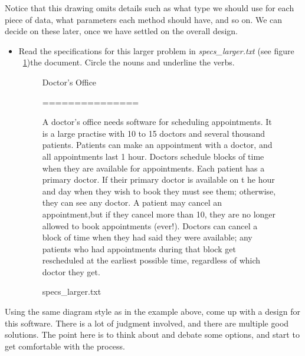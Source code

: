 \documentclass[12pt]{article}
\begin{document}
\bigskip

\noindent Notice that this drawing omits details such as what type we should use for each
piece of data, what parameters each method should have, and so on. We can decide
on these later, once we have settled on the overall design.

\begin{itemize}
    \item Read the specifications for this larger problem in \textit{specs\_larger.txt}
    (see figure ~\ref{fig:specsLargerText})the document. Circle the nouns and underline
    the verbs.

    \bigskip

    \begin{figure}
        \begin{mdframed}
            Doctor's Office

            ===============

            \bigskip

            A doctor's office needs software for scheduling appointments. It is a large
            practise with 10 to 15 doctors and several thousand patients. Patients
            can make an appointment with a doctor, and all appointments last 1 hour.
            Doctors schedule blocks of time when they are available for appointments.
            Each patient has a primary doctor. If their primary doctor is available on t
            he hour and day when they wish to book they must see them; otherwise, they
            can see any doctor. A patient may cancel an appointment,but if they cancel
            more than 10, they are no longer allowed to book appointments (ever!).
            Doctors can cancel a block of time when they had said they were available;
            any patients who had appointments during that block get rescheduled at the
            earliest possible time, regardless of which doctor they get.
        \end{mdframed}
        \caption{specs\_larger.txt}
        \label{fig:specsLargerText}
    \end{figure}
\end{itemize}

\bigskip

Using the same diagram style as in the example above, come up with a design for
this software. There is a lot of judgment involved, and there are multiple good
solutions. The point here is to think about and debate some options, and start to
get comfortable with the process.
\end{document}
